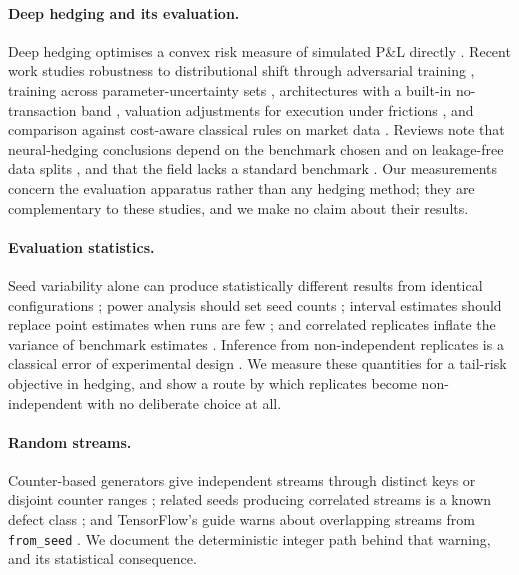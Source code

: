 \documentclass{article}
\newcommand{\fromseed}{\texttt{from\_seed}}
\begin{document}
\paragraph{Deep hedging and its evaluation.} Deep hedging optimises a convex risk measure of
simulated P\&L directly \citep{buehler2019deep}. Recent work studies robustness to distributional
shift through adversarial training \citep{he2025distributional}, training across
parameter-uncertainty sets \citep{lutkebohmert2022robust}, architectures with a built-in
no-transaction band \citep{imaki2023ntb}, valuation adjustments for execution under frictions
\citep{sakuma2026robust}, and comparison against cost-aware classical rules on market data
\citep{kumar2026deep}. Reviews note that neural-hedging conclusions depend on the benchmark chosen
and on leakage-free data splits \citep{ruf2020neural}, and that the field lacks a standard
benchmark \citep{pickard2023deep}. Our measurements concern the evaluation apparatus rather than
any hedging method; they are complementary to these studies, and we make no claim about their
results.

\paragraph{Evaluation statistics.} Seed variability alone can produce statistically different
results from identical configurations \citep{henderson2018deep}; power analysis should set seed
counts \citep{colas2018seeds}; interval estimates should replace point estimates when runs are few
\citep{agarwal2021deep}; and correlated replicates inflate the variance of benchmark estimates
\citep{bouthillier2021accounting}. Inference from non-independent replicates is a classical error
of experimental design \citep{hurlbert1984pseudoreplication}. We measure these quantities for a
tail-risk objective in hedging, and show a route by which replicates become non-independent with
no deliberate choice at all.

\paragraph{Random streams.} Counter-based generators give independent streams through distinct keys
or disjoint counter ranges \citep{salmon2011parallel}; related seeds producing correlated streams
is a known defect class \citep{matsumoto2007common}; and TensorFlow's guide warns about overlapping
streams from \fromseed{} \citep{tensorflow2024guide}. We document the deterministic integer path
behind that warning, and its statistical consequence.
\end{document}
